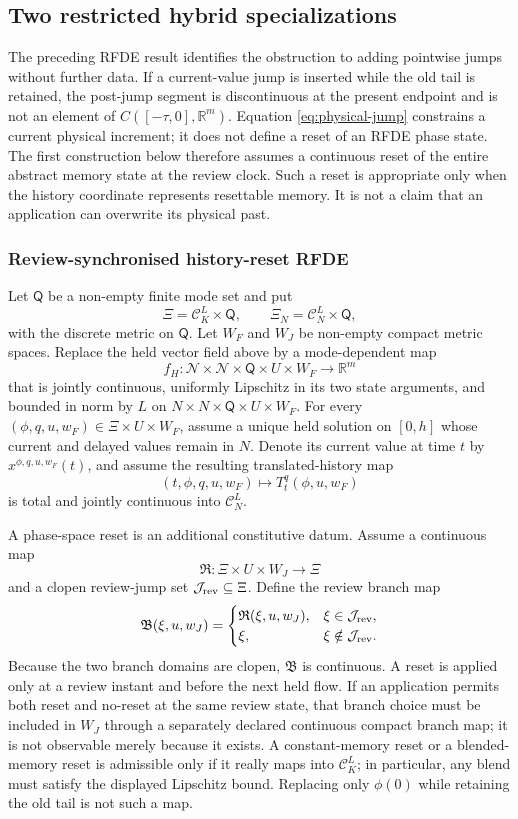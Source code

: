 \documentclass[11pt]{article}
\theoremstyle{definition}
\begin{document}
\subsection{Two restricted hybrid specializations}

The preceding RFDE result identifies the obstruction to adding pointwise
jumps without further data.  If a current-value jump is inserted while the
old tail is retained, the post-jump segment is discontinuous at the present
endpoint and is not an element of $C([ -\tau,0],\mathbb R^m)$.  Equation
\eqref{eq:physical-jump} constrains a current physical increment; it does
not define a reset of an RFDE phase state.  The first construction below
therefore assumes a continuous reset of the entire abstract memory state at
the review clock.  Such a reset is appropriate only when the history
coordinate represents resettable memory.  It is not a claim that an
application can overwrite its physical past.

\subsubsection{Review-synchronised history-reset RFDE}

Let $\mathsf Q$ be a non-empty finite mode set and put
\[
\Xi=\mathscr C_K^L\times\mathsf Q,
\qquad
\Xi_N=\mathscr C_N^L\times\mathsf Q,
\]
with the discrete metric on $\mathsf Q$.  Let $W_F$ and $W_J$ be non-empty
compact metric spaces.  Replace the held vector field above by a
mode-dependent map
\[
f_H:\mathcal N\times\mathcal N\times\mathsf Q\times U\times W_F
\longrightarrow\mathbb R^m
\]
that is jointly continuous, uniformly Lipschitz in its two state arguments,
and bounded in norm by $L$ on
$N\times N\times\mathsf Q\times U\times W_F$.  For every
$(\phi,q,u,w_F)\in\Xi\times U\times W_F$, assume a unique held solution on
$[0,h]$ whose current and delayed values remain in $N$.  Denote its current
value at time $t$ by $x^{\phi,q,u,w_F}(t)$, and assume the resulting
translated-history map
\[
(t,\phi,q,u,w_F)\longmapsto T_t^q(\phi,u,w_F)
\]
is total and jointly continuous into $\mathscr C_N^L$.

A phase-space reset is an additional constitutive datum.  Assume a
continuous map
\[
\mathfrak R:\Xi\times U\times W_J\longrightarrow\Xi
\]
and a clopen review-jump set $\mathcal J_{\rm rev}\subseteq\Xi$.  Define the
review branch map
\[
\mathfrak B(\xi,u,w_J)=
\begin{cases}
\mathfrak R(\xi,u,w_J),&\xi\in\mathcal J_{\rm rev},\\
\xi,&\xi\notin\mathcal J_{\rm rev}.
\end{cases}
\]
Because the two branch domains are clopen, $\mathfrak B$ is continuous.  A
reset is applied only at a review instant and before the next held flow.
If an application permits both reset and no-reset at the same review state,
that branch choice must be included in $W_J$ through a separately declared
continuous compact branch map; it is not observable merely because it
exists.  A constant-memory reset or a blended-memory reset is admissible
only if it really maps into $\mathscr C_K^L$; in particular, any blend must
satisfy the displayed Lipschitz bound.  Replacing only $\phi(0)$ while
retaining the old tail is not such a map.
\end{document}
